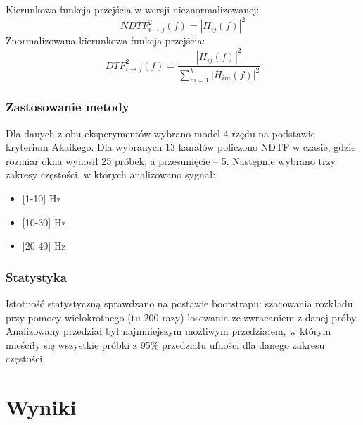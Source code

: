 \documentclass{pracamgr_2}
\begin{document}
Kierunkowa funkcja przejścia w wersji nieznormalizowanej:
\begin{equation}
{NDTF}_{i\to j}^2 (f) = {\left|H_{ij}(f) \right|}^2
\end{equation}
Znormalizowana kierunkowa funkcja przejścia:
\begin{equation}
{DTF}_{i\to j}^2 (f) = \frac{{\left|H_{ij}(f) \right|}^2}{\sum_{m=1}^{k}{\left|H_{im}(f) \right|}^2 }
\end{equation}
\subsection{Zastosowanie metody}
Dla danych z obu eksperymentów wybrano model 4 rzędu na podstawie kryterium Akaikego. Dla wybranych 13 kanałów policzono NDTF w czasie, gdzie rozmiar okna wynosił 25 próbek, a przesunięcie -- 5. Następnie wybrano trzy zakresy częstości, w których analizowano sygnał: 
\begin{itemize}
	\item {[1-10]} Hz
	\item {[10-30]} Hz
	\item {[20-40]} Hz
\end{itemize}
\subsection{Statystyka}
Istotność statystyczną sprawdzano na postawie bootstrapu: szacowania rozkładu przy pomocy wielokrotnego (tu 200 razy) losowania ze zwracaniem z danej próby. Analizowany przedział był najmniejszym możliwym przedziałem, w którym mieściły się wszystkie próbki z 95\% przedziału ufności dla danego zakresu częstości.
\chapter{Wyniki}
\end{document}
